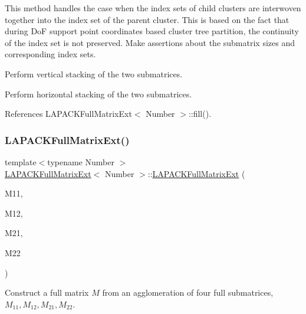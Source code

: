 This method handles the case when the index sets of child clusters are interwoven together into the index set of the parent cluster. This is based on the fact that during DoF support point coordinates based cluster tree partition, the continuity of the index set is not preserved. Make assertions about the submatrix sizes and corresponding index sets.

Perform vertical stacking of the two submatrices.

Perform horizontal stacking of the two submatrices.

References L\+A\+P\+A\+C\+K\+Full\+Matrix\+Ext$<$ Number $>$\+::fill().

\mbox{\label{classLAPACKFullMatrixExt_aa94c466249d0df9e122443c0b6263cf3}} 
\subsubsection{\texorpdfstring{L\+A\+P\+A\+C\+K\+Full\+Matrix\+Ext()}{LAPACKFullMatrixExt()}\hspace{0.1cm}{\footnotesize\ttfamily [9/10]}}
{\footnotesize\ttfamily template$<$typename Number $>$ \\
\hyperlink{classLAPACKFullMatrixExt}{L\+A\+P\+A\+C\+K\+Full\+Matrix\+Ext}$<$ Number $>$\+::\hyperlink{classLAPACKFullMatrixExt}{L\+A\+P\+A\+C\+K\+Full\+Matrix\+Ext} (\begin{DoxyParamCaption}\item[{const \hyperlink{classLAPACKFullMatrixExt}{L\+A\+P\+A\+C\+K\+Full\+Matrix\+Ext}$<$ Number $>$ \&}]{M11,  }\item[{const \hyperlink{classLAPACKFullMatrixExt}{L\+A\+P\+A\+C\+K\+Full\+Matrix\+Ext}$<$ Number $>$ \&}]{M12,  }\item[{const \hyperlink{classLAPACKFullMatrixExt}{L\+A\+P\+A\+C\+K\+Full\+Matrix\+Ext}$<$ Number $>$ \&}]{M21,  }\item[{const \hyperlink{classLAPACKFullMatrixExt}{L\+A\+P\+A\+C\+K\+Full\+Matrix\+Ext}$<$ Number $>$ \&}]{M22 }\end{DoxyParamCaption})}

Construct a full matrix $M$ from an agglomeration of four full submatrices, $M_{11}, M_{12}, M_{21}, M_{22}$.

